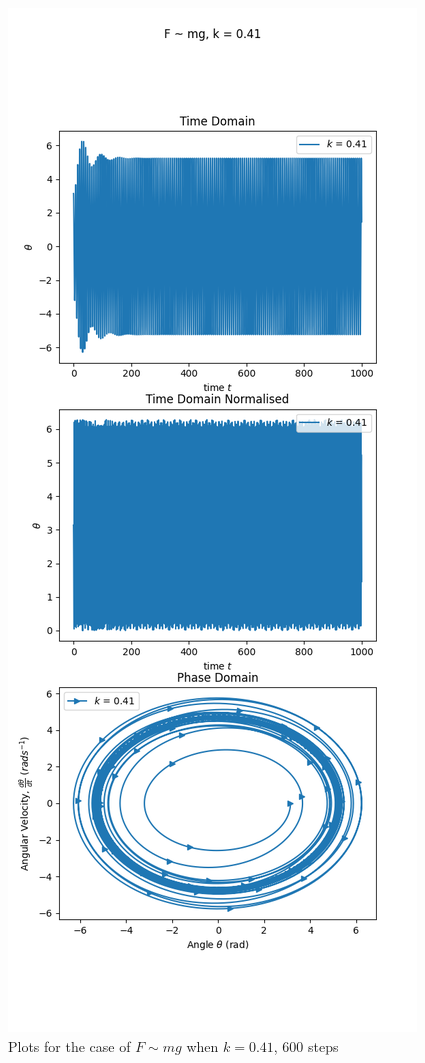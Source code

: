 \documentclass[10pt, twocolumn]{article}
\begin{document}
\begin{figure}[H]
    \centering
    \includegraphics[width = \columnwidth]{Projects/ForcedSimplePendulum/Plots/Plot of F~mg, k is 0.41 (long).png}
    \caption{Plots for the case of $F\sim{mg}$ when $k = 0.41$, 600 steps}
    \label{k = 0.41 long}
\end{figure}
\onecolumn
\end{document}
